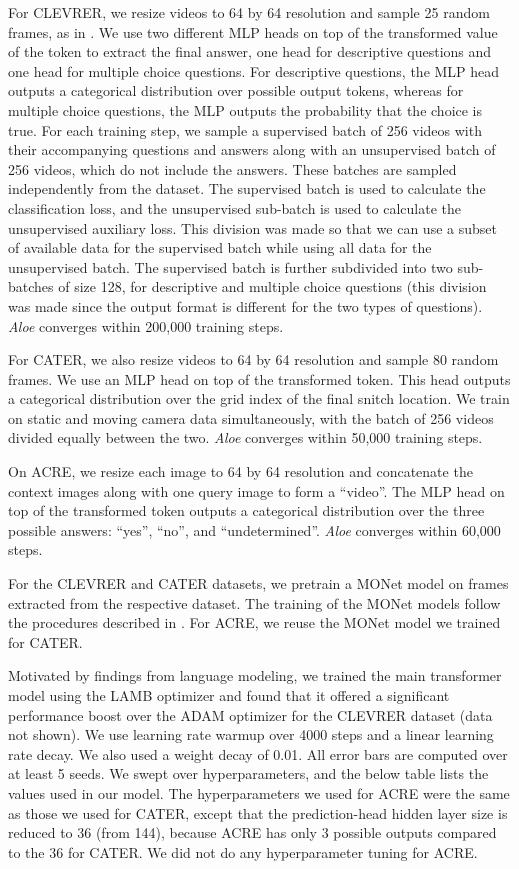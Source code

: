 \documentclass{article}
\newcommand{\Model}{\emph{Aloe}}
\begin{document}
For CLEVRER, we resize videos to 64 by 64 resolution and sample 25 random frames, as in \citep{clevrer}.
We use two different MLP heads on top of the transformed value of the  token
to extract the final answer, one head for descriptive questions and one head for multiple choice questions.
For descriptive questions, the MLP head outputs a categorical distribution over possible output tokens,
whereas for multiple choice questions, the MLP outputs the probability that the choice is true.
For each training step, we sample a supervised batch of 256 videos with their accompanying questions and answers along with an unsupervised batch of 256 videos, which do not include the answers.
These batches are sampled independently from the dataset.
The supervised batch is used to calculate the classification loss,
and the unsupervised sub-batch is used to calculate the unsupervised auxiliary loss.
This division was made so that we can use a subset of available data for the supervised batch while using all data for the unsupervised batch.
The supervised batch is further subdivided into two sub-batches of size 128, for descriptive and multiple choice questions (this division was made since the output format is different for the two types of questions).
\Model{} converges within 200,000 training steps.

For CATER, we also resize videos to 64 by 64 resolution and sample 80 random frames.
We use an MLP head on top of the transformed  token.
This head outputs a categorical distribution over the grid index of the final snitch location.
We train on static and moving camera data simultaneously, with the batch of 256 videos divided equally between the two.
\Model{} converges within 50,000 training steps.

On ACRE, we resize each image to 64 by 64 resolution and concatenate the context images along with one query image
to form a ``video''.
The MLP head on top of the transformed  token outputs a categorical distribution over the three possible answers:
``yes'', ``no'', and ``undetermined''.
\Model{} converges within 60,000 steps.

For the CLEVRER and CATER datasets, we pretrain a MONet model on frames extracted from the respective dataset.
The training of the MONet models follow the procedures described in \cite{monet}.
For ACRE, we reuse the MONet model we trained for CATER.

Motivated by findings from language modeling,
we trained the main transformer model using the LAMB optimizer \citep{You-LAMB} and found that it offered 
a significant performance boost over
the ADAM optimizer \citep{kingma2014adam} for the CLEVRER dataset (data not shown).
We use learning rate warmup over 4000 steps and a linear learning rate decay.
We also used a weight decay of 0.01.
All error bars are computed over at least 5 seeds.
We swept over hyperparameters, and the below table lists the values used in our model.
The hyperparameters we used for ACRE
were the same as those we used for CATER,
except that the prediction-head hidden layer size is reduced to 36 (from 144),
because ACRE has only 3 possible outputs compared to the 36 for CATER.
We did not do any hyperparameter tuning for ACRE.
\end{document}
